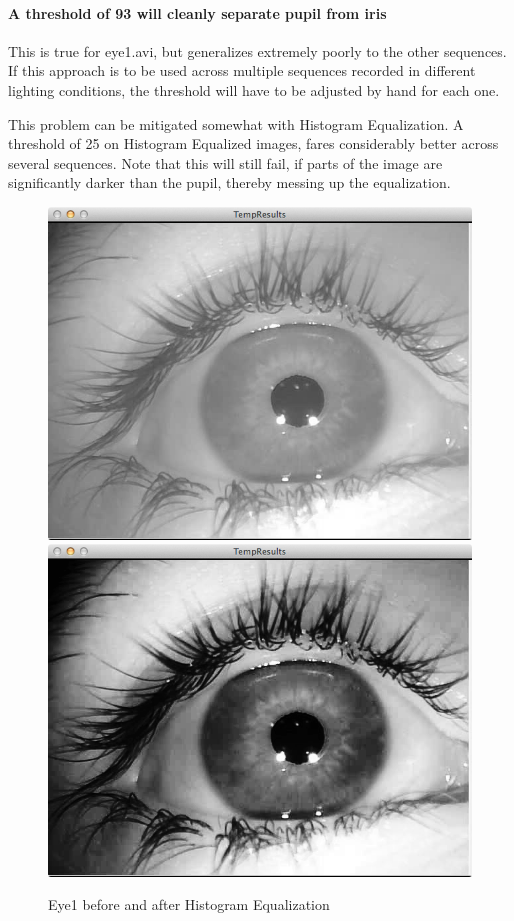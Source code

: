 \documentclass[a4paper,11pt]{article}
\begin{document}
\paragraph{A threshold of 93 will cleanly separate pupil from iris}
This is true for eye1.avi, but generalizes extremely poorly to the other sequences. If this approach is to be used across multiple sequences recorded in different lighting conditions, the threshold will have to be adjusted by hand for each one.

This problem can be mitigated somewhat with Histogram Equalization. A threshold of 25 on Histogram Equalized images, fares considerably better across several sequences. Note that this will still fail, if parts of the image are significantly darker than the pupil, thereby messing up the equalization.

\begin{figure}[ht]
  \centering
  \includegraphics[scale=0.2]{eye1}
  \includegraphics[scale=0.2]{eye1_hist_eq}
  \caption{Eye1 before and after Histogram Equalization}
  \label{fig:eye1_hist_eq}
\end{figure}
\end{document}
